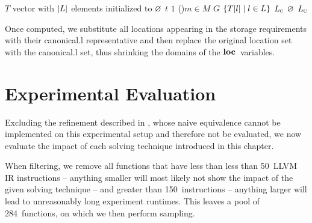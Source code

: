 \begin{algorithm}[t]
  {%
    $T$ \Assign vector with $\mCard{L}$ elements initialized to $\varnothing$\;
    $t$ \Assign $1$\;
    \For(){$m \in M$}{%
    }
    $G$ \Assign $\mSetBuilder{T[l]}{l \in L}$
    $L_{\textrm{\textsc{c}}}$ \Assign $\varnothing$\;
    \Return $L_{\textrm{\textsc{c}}}$\;
  }

  \caption[Algorithm for computing the set of canonical locations]%
          {%
            Computes the canonical locations from a given location set.
            If location restrictions for some data are already enforced by
            the function, then these are also tagged and processed accordingly%
          }
\end{algorithm}

Once computed, we substitute all locations appearing in the storage requirements
with their \gls{canonical.l} representative and then replace the original
\gls{location set} with the \gls{canonical.l} set, thus shrinking the
\glspl{domain} of the $\mVar{loc}$~\glspl{variable}.


\section{Experimental Evaluation}

Excluding the refinement described in , whose naive equivalence cannot be implemented on this
experimental setup and therefore not be evaluated, we now evaluate the impact of
each solving technique introduced in this chapter.

When filtering, we remove all \glspl{function} that have less than less than
\num{50}~\gls{LLVM} \gls{IR} \glspl{instruction} -- anything smaller will most
likely not show the impact of the given solving technique -- and greater than
\num{150}~\glspl{instruction} -- anything larger will lead to unreasonably long
experiment runtimes.
%
This leaves a pool of \num{284}~\glspl{function}, on which we then perform
sampling.

